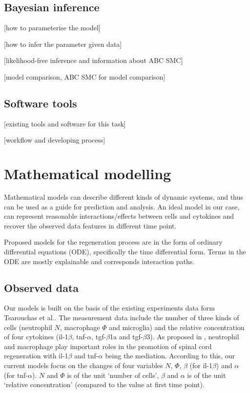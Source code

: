 \documentclass[12pt,a4paper]{report}
\begin{document}
\section{Bayesian inference}

[how to parameterise the model]

[how to infer the parameter given data]

[likelihood-free inference and information about ABC SMC]

[model comparison, ABC SMC for model comparison]

\section{Software tools}

[existing tools and software for this task]

[workflow and developing process]

\chapter{Mathematical modelling}

Mathematical models can describe different kinds of dynamic systems, and thus can be used as a guide for prediction and analysis. An ideal model in our case, can represent reasonable interactions/effects between cells and cytokines and recover the observed  data features in different time point. 

Proposed models for the regeneration process are in the form of ordinary differential equations (ODE), specifically the time differential form. Terms in the ODE are mostly explainable and corresponds interaction paths. 

\section{Observed data}

Our models is built on the basis of the existing experiments data form Tsarouchas et al.\cite{ref:Tsarouchas}. The measurement data include the number of three kinds of cells (neutrophil $N$, macrophage $\Phi$ and microglia) and the relative concentration of four cytokines (il-1$\beta$, tnf-$\alpha$, tgf-$\beta$1a and tgf-$\beta$3). As proposed in \cite{ref:Tsarouchas}, neutrophil and macrophage play important roles in the promotion of spinal cord regeneration with il-1$\beta$ and tnf-$\alpha$ being the mediation. According to this, our current models focus on the changes of four variables $N$, $\Phi $, $\beta$ (for il-1$\beta$) and $\alpha$ (for tnf-$\alpha$). $N$ and $\Phi$ is of the unit `number of cells', $\beta$ and $\alpha$ is of the unit `relative concentration' (compared to the value at first time point).
\end{document}
